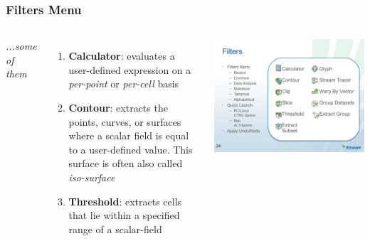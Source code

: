 \documentclass[]{beamer}
\begin{document}

\begin{frame}
\frametitle{Filters Menu}
    \begin{columns}[c] %
        \textit{...some of them}
        \begin{enumerate}
            \item {\bf Calculator}: evaluates a user-defined expression on a {\it per-point} or {\it per-cell} basis
            \item {\bf Contour}: extracts the points, curves, or surfaces where a scalar field is equal to a user-defined value. This surface is often also called {\it iso-surface}
\item {\bf Threshold}: extracts cells that lie within a specified range of a scalar-field
        \end{enumerate}
        \includegraphics[width=.9999\textwidth]{pics/Filters}
    \end{columns}
\end{frame}
\end{document}
